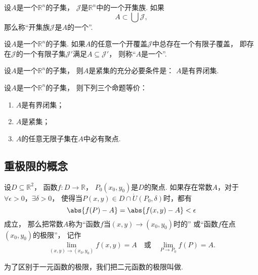 \begin{definition}
设\(A\)是一个\(\mathbb{R}^n\)的子集，
\(\mathscr{J}\)是\(\mathbb{R}^n\)中的一个开集族.
如果\begin{equation*}
	A \subset \bigcup\mathscr{J},
\end{equation*}
那么称“开集族\(\mathscr{J}\)是\(A\)的一个”.
\end{definition}
\begin{definition}
设\(A\)是一个\(\mathbb{R}^n\)的子集.
如果\(A\)的任意一个开覆盖\(\mathscr{J}\)中总存在一个有限子覆盖，
即存在\(\mathscr{J}\)的一个有限子集\(\mathscr{J}'\)满足\(A \subseteq \mathscr{J}'\)，
则称“\(A\)是一个”.
\end{definition}
\begin{theorem}
设\(A\)是一个\(\mathbb{R}^n\)的子集，
则\(A\)是紧集的充分必要条件是：
\(A\)是有界闭集.
\end{theorem}
\begin{theorem}
设\(A\)是一个\(\mathbb{R}^n\)的子集，
则下列三个命题等价：\begin{enumerate}
	\item \(A\)是有界闭集；
	\item \(A\)是紧集；
	\item \(A\)的任意无限子集在\(A\)中必有聚点.
\end{enumerate}
\end{theorem}

\subsection{重极限的概念}
\begin{definition}
设\(D\subseteq\mathbb{R}^2\)，
函数\(f\colon D\to\mathbb{R}\)，
\(P_0(x_0,y_0)\)是\(D\)的聚点.
如果存在常数\(A\)，对于\(\forall \epsilon > 0\)，\(\exists \delta > 0\)，
使得当\(P(x,y) \in D \cap \mathring{U}(P_0,\delta)\)时，都有\begin{equation*}
	\abs{f(P)-A} = \abs{f(x,y)-A} < \epsilon
\end{equation*}成立，
那么把常数\(A\)称为“函数\(f\)当\((x,y)\to(x_0,y_0)\)时的”
或“函数\(f\)在点\((x_0,y_0)\)的极限”，
记作\begin{equation*}
	\lim_{(x,y)\to(x_0,y_0)} f(x,y) = A
	\quad\text{或}\quad
	\lim_{P \to P_0} f(P) = A.
\end{equation*}

为了区别于一元函数的极限，我们把二元函数的极限叫做.
\end{definition}

